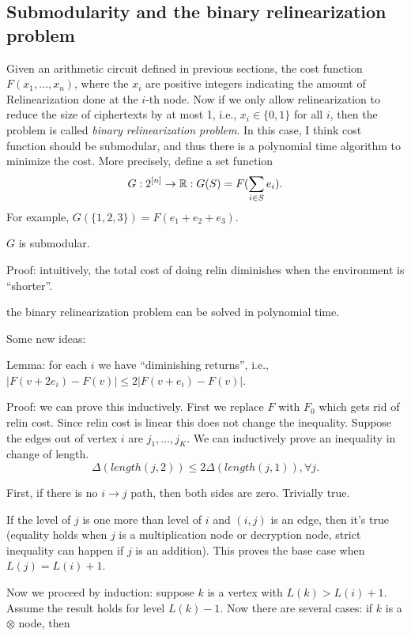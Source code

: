 \documentclass[11pt]{article} %
\theoremstyle{plain}
\theoremstyle{definition}
\begin{document}
\subsection{Submodularity and the binary relinearization problem}

Given an arithmetic circuit defined in previous sections, the cost function $F(x_1, \ldots, x_n)$, where the $x_i$ are positive integers indicating the amount of Relinearization done at the $i$-th node. Now if we only allow relinearization to reduce the size of ciphertexts by at most 1, i.e., $x_i \in \{0, 1\}$ for all $i$, then the problem is called \emph{binary relinearization problem}. In this case, I think cost function should be submodular, and thus there is a polynomial time algorithm to minimize the cost. More precisely, define a set function 
\[
	G: 2^{[n]} \to \mathbb{R}: G(S) = F(\sum_{i \in S}e_i). 
\]
For example, $G(\{1,2,3\}) = F(e_1 + e_2 + e_3)$.  

\begin{lemma}
$G$ is submodular. 
\end{lemma}
Proof: intuitively, the total cost of doing relin diminishes when the environment is ``shorter''. 

\begin{corollary}
the binary relinearization problem can be solved in polynomial time. 
\end{corollary}

Some new ideas: 

Lemma: for each $i$ we have ``diminishing returns'', i.e.,  $|F(v + 2e_i) - F(v) |  \leq 2 |F(v+e_i) - F(v)|$. 

Proof: we can prove this inductively. First we replace $F$  with $F_0$ which gets rid of relin cost. Since relin cost is linear this does not change the inequality. Suppose the edges out of vertex $i$ are $j_1, \ldots ,j_K$. We can inductively prove an inequality in change of length. 
\[
	\Delta(length(j, 2)) \leq 2\Delta(length(j,1)), \forall j.  
\]


First, if there is no $i \to j$ path, then both sides are zero. Trivially true. 

If the level of $j$ is one more than level of $i$ and $(i,j)$ is an edge, then it's true (equality holds when 
$j$ is a multiplication node or decryption node, strict inequality can happen if $j$ is an addition). This proves the base case when $L(j) = L(i) + 1$. 

Now we proceed by induction: suppose $k$ is a vertex with $L(k) > L(i) + 1$. Assume the result 
holds for level $L(k) - 1$. Now there are several cases: if $k$ is a $\otimes$ node, then 
\end{document}
